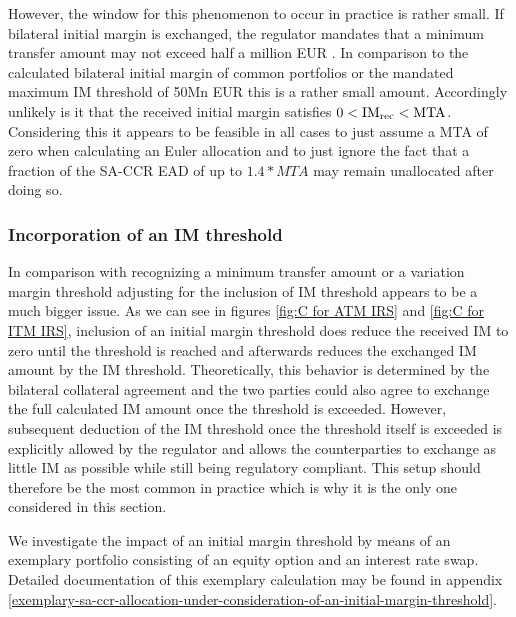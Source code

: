\documentclass[../Thesis_AHoecherl.tex]{subfiles}
\begin{document}
    However, the window for this phenomenon to occur in practice is rather small. If bilateral initial margin is exchanged, the regulator mandates that a minimum transfer amount may not exceed half a million EUR \cite[Requirement 2.3]{BCBS_MarginRequirements}.
    In comparison to the calculated bilateral initial margin of common portfolios or the mandated maximum \gls{IM} threshold of 50Mn EUR \cite[Requirement 2.2]{BCBS_MarginRequirements} this is a rather small amount.
    Accordingly unlikely is it that the received initial margin satisfies $0<\text{IM\textsubscript{rec}}<\text{MTA}$.
    Considering this it appears to be feasible in all cases to just assume a \gls{MTA} of zero when calculating an Euler allocation and to just ignore the fact that a fraction of the \gls{SA-CCR} \gls{EAD} of up to $1.4*MTA$ may remain unallocated after doing so.

    \subsubsection{Incorporation of an IM threshold\label{sec:Incorporation of an IM threshold}}
    
    In comparison with recognizing a minimum transfer amount or a variation margin threshold adjusting for the inclusion of \gls{IM} threshold appears to be a much bigger issue.
    As we can see in figures \ref{fig:C for ATM IRS} and \ref{fig:C for ITM IRS}, inclusion of an initial margin threshold does reduce the received \gls{IM} to zero until the threshold is reached and afterwards reduces the exchanged \gls{IM} amount by the \gls{IM} threshold.
    Theoretically, this behavior is determined by the bilateral collateral agreement and the two parties could also agree to exchange the full calculated \gls{IM} amount once the threshold is exceeded.
    However, subsequent deduction of the \gls{IM} threshold once the threshold itself is exceeded is explicitly allowed by the regulator \cite[Background discussion 2(h)]{BCBS_MarginRequirements} and allows the counterparties to exchange as little \gls{IM} as possible while still being regulatory compliant.
    This setup should therefore be the most common in practice which is why it is the only one considered in this section.

    We investigate the impact of an initial margin threshold by means of an exemplary portfolio consisting of an equity option and an interest rate swap.
    Detailed documentation of this exemplary calculation may be found in appendix \ref{exemplary-sa-ccr-allocation-under-consideration-of-an-initial-margin-threshold}.
\end{document}
